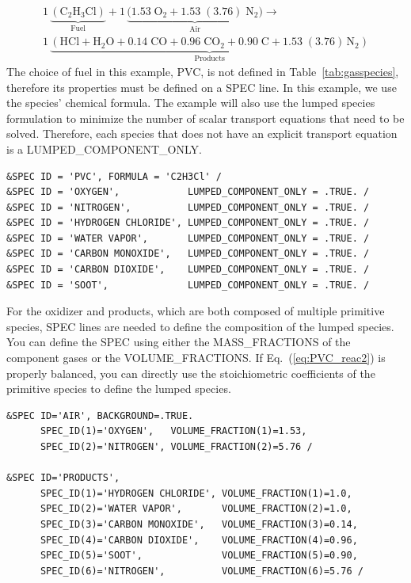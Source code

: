 \documentclass[11pt]{book}
\begin{document}
\begin{multline}\label{eq:PVC_reac2}
1\,\underbrace{\mathrm{(C_2H_3Cl)}}_\text{Fuel} + 1\,\underbrace{\mathrm{(1.53 \; O_2 + 1.53 \;(3.76) \; N_2})}_\text{Air} \longrightarrow \\
1\,\underbrace{\mathrm{(HCl +  H_2O + 0.14 \; CO + 0.96 \; CO_2 + 0.90\; C + 1.53\; (3.76) \, N_2)}}_\text{Products}
\end{multline}
The choice of fuel in this example, PVC, is not defined in Table~\ref{tab:gasspecies}, therefore its properties must be defined on a {\ct SPEC} line. In this example, we use the species' chemical formula. The example will also use the lumped species formulation to minimize the number of scalar transport equations that need to be solved. Therefore, each species that does not have an explicit transport equation is a {\ct LUMPED\_COMPONENT\_ONLY}.
\begin{lstlisting}
&SPEC ID = 'PVC', FORMULA = 'C2H3Cl' /
&SPEC ID = 'OXYGEN',            LUMPED_COMPONENT_ONLY = .TRUE. /
&SPEC ID = 'NITROGEN',          LUMPED_COMPONENT_ONLY = .TRUE. /
&SPEC ID = 'HYDROGEN CHLORIDE', LUMPED_COMPONENT_ONLY = .TRUE. /
&SPEC ID = 'WATER VAPOR',       LUMPED_COMPONENT_ONLY = .TRUE. /
&SPEC ID = 'CARBON MONOXIDE',   LUMPED_COMPONENT_ONLY = .TRUE. /
&SPEC ID = 'CARBON DIOXIDE',    LUMPED_COMPONENT_ONLY = .TRUE. /
&SPEC ID = 'SOOT',              LUMPED_COMPONENT_ONLY = .TRUE. /
\end{lstlisting}
For the oxidizer and products, which are both composed of multiple primitive species, {\ct SPEC} lines are needed to define the composition of the lumped species. You can define the {\ct SPEC} using either the {\ct MASS\_FRACTIONS} of the component gases or the {\ct VOLUME\_FRACTIONS}. If Eq.~(\ref{eq:PVC_reac2}) is properly balanced, you can directly use the stoichiometric coefficients of the primitive species to define the lumped species.
\begin{lstlisting}
&SPEC ID='AIR', BACKGROUND=.TRUE.
      SPEC_ID(1)='OXYGEN',   VOLUME_FRACTION(1)=1.53,
      SPEC_ID(2)='NITROGEN', VOLUME_FRACTION(2)=5.76 /

&SPEC ID='PRODUCTS',
      SPEC_ID(1)='HYDROGEN CHLORIDE', VOLUME_FRACTION(1)=1.0,
      SPEC_ID(2)='WATER VAPOR',       VOLUME_FRACTION(2)=1.0,
      SPEC_ID(3)='CARBON MONOXIDE',   VOLUME_FRACTION(3)=0.14,
      SPEC_ID(4)='CARBON DIOXIDE',    VOLUME_FRACTION(4)=0.96,
      SPEC_ID(5)='SOOT',              VOLUME_FRACTION(5)=0.90,
      SPEC_ID(6)='NITROGEN',          VOLUME_FRACTION(6)=5.76 /
\end{lstlisting}
\end{document}

